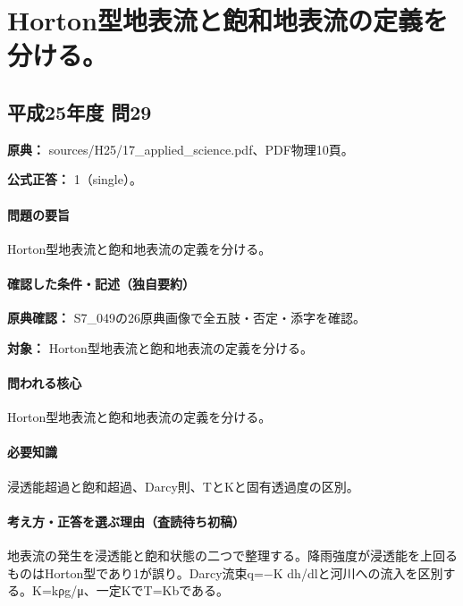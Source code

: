 \section{Horton型地表流と飽和地表流の定義を分ける。}

\subsection{平成25年度 問29}
\label{q:h25-reg-applied-29}

\noindent\textbf{原典：} sources/H25/17\_applied\_science.pdf、PDF物理10頁。

\textbf{公式正答：} 1（single）。

\paragraph{問題の要旨} Horton型地表流と飽和地表流の定義を分ける。

\paragraph{確認した条件・記述（独自要約）}\mbox{}\par

\noindent\textbf{原典確認：} S7\_049の26原典画像で全五肢・否定・添字を確認。\par

\noindent\textbf{対象：} Horton型地表流と飽和地表流の定義を分ける。\par

\paragraph{問われる核心} Horton型地表流と飽和地表流の定義を分ける。

\paragraph{必要知識} 浸透能超過と飽和超過、Darcy則、TとKと固有透過度の区別。

\paragraph{考え方・正答を選ぶ理由（査読待ち初稿）} 地表流の発生を浸透能と飽和状態の二つで整理する。降雨強度が浸透能を上回るものはHorton型であり1が誤り。Darcy流束q=−K dh/dlと河川への流入を区別する。K=\allowbreak{}kρg/μ、一定KでT=\allowbreak{}Kbである。

